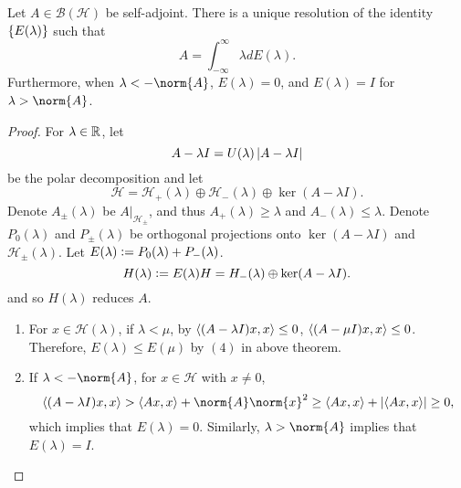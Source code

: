 \documentclass[a4paper,12pt]{article}
\begin{document}
\begin{thm}
    Let $A \in \mathcal{B}(\mathcal{H})$ be self-adjoint. There is a unique resolution of the identity $\left\{E(\lambda)\right\}$ such that
    \begin{equation*}
        A = \int_{-\infty}^\infty \lambda dE(\lambda).
    \end{equation*}
    Furthermore, when $\lambda < -\norm{A}$, $E(\lambda) = 0$, and $E(\lambda) = I$ for $\lambda > \norm{A}$.
\end{thm}
\begin{proof}
    For $\lambda \in \mathbb{R}$, let
    \begin{equation*}
        A - \lambda I = U(\lambda) \left\lvert A - \lambda I\right\lvert
    \end{equation*}
    be the polar decomposition and let
    \begin{equation*}
        \mathcal{H} = \mathcal{H}_+(\lambda) \oplus \mathcal{H}_-(\lambda) \oplus \ker (A - \lambda I).
    \end{equation*}
    Denote $A_\pm(\lambda)$ be $A|_{\mathcal{H}_\pm}$, and thus $A_+(\lambda) \geq \lambda$ and $A_-(\lambda) \leq \lambda$. Denote $P_0(\lambda)$ and $P_\pm(\lambda)$ be orthogonal projections onto $\ker (A - \lambda I)$ and $\mathcal{H}_\pm(\lambda)$. Let $E(\lambda) \vcentcolon= P_0(\lambda) + P_-(\lambda)$.
    \begin{equation*}
        H(\lambda) \vcentcolon= E(\lambda) H=H_{-}(\lambda) \oplus \operatorname{ker}(A-\lambda I).
    \end{equation*}
    and so $H(\lambda)$ reduces $A$.

    \begin{enumerate}[label=(\arabic{*})]
        \item For $x \in \mathcal{H}(\lambda)$, if $\lambda < \mu$, by $\left\langle (A -\lambda I)x,x \right\rangle \leq 0$, $\left\langle (A -\mu I)x,x \right\rangle \leq 0$. Therefore, $E(\lambda) \leq E(\mu)$ by $(4)$ in above theorem.

        \item If $\lambda < - \norm{A}$, for $x \in \mathcal{H}$ with $x\neq 0$,
        \begin{equation*}
            \inn{(A- \lambda I)x,x} > \inn{Ax,x} + \norm{A}\norm{x}^2 \geq \inn{Ax,x} + \abs{\inn{Ax,x}} \geq 0,
        \end{equation*}
        which implies that $E(\lambda) = 0$. Similarly, $\lambda > \norm{A}$ implies that $E(\lambda) = I$.


\end{enumerate}
\end{proof}
\end{document}
